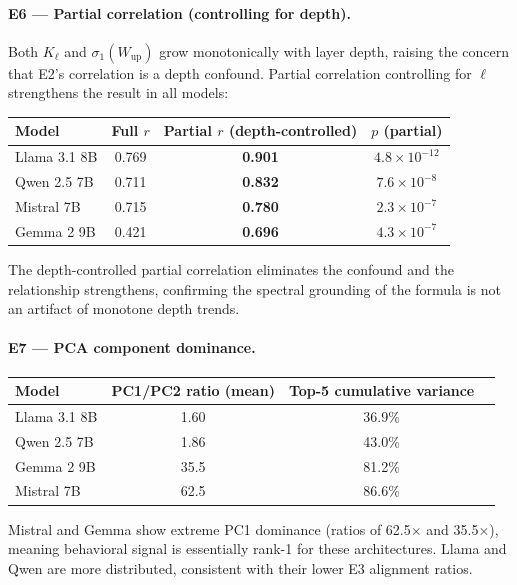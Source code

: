 \documentclass[11pt,a4paper]{article}
\begin{document}
\paragraph{E6 — Partial correlation (controlling for depth).}
Both $K_\ell$ and $\sigma_1(W_\mathrm{up})$ grow monotonically with layer
depth, raising the concern that E2's correlation is a depth confound.
Partial correlation controlling for $\ell$ strengthens the result in all
models:

\begin{center}\small
\begin{tabular}{lccc}
\toprule
Model & Full $r$ & Partial $r$ (depth-controlled) & $p$ (partial) \\
\midrule
Llama 3.1 8B & 0.769 & \textbf{0.901} & $4.8\!\times\!10^{-12}$ \\
Qwen 2.5 7B  & 0.711 & \textbf{0.832} & $7.6\!\times\!10^{-8}$ \\
Mistral 7B   & 0.715 & \textbf{0.780} & $2.3\!\times\!10^{-7}$ \\
Gemma 2 9B   & 0.421 & \textbf{0.696} & $4.3\!\times\!10^{-7}$ \\
\bottomrule
\end{tabular}
\end{center}
The depth-controlled partial correlation eliminates the confound and the
relationship strengthens, confirming the spectral grounding of the formula
is not an artifact of monotone depth trends.

\paragraph{E7 — PCA component dominance.}
\begin{center}\small
\begin{tabular}{lccc}
\toprule
Model & PC1/PC2 ratio (mean) & Top-5 cumulative variance \\
\midrule
Llama 3.1 8B & 1.60 & 36.9\% \\
Qwen 2.5 7B  & 1.86 & 43.0\% \\
Gemma 2 9B   & 35.5 & 81.2\% \\
Mistral 7B   & 62.5 & 86.6\% \\
\bottomrule
\end{tabular}
\end{center}
Mistral and Gemma show extreme PC1 dominance (ratios of 62.5$\times$ and
35.5$\times$), meaning behavioral signal is essentially rank-1 for these
architectures.
Llama and Qwen are more distributed, consistent with their lower E3 alignment
ratios.
\end{document}
